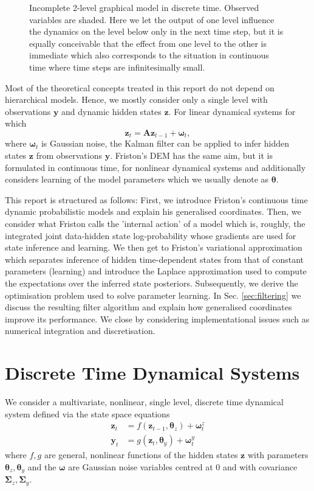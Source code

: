 \documentclass[a4paper,10pt]{article}
\newcommand{\bs}[1]{\mathbf{#1}}					%
\newcommand{\bgs}[1]{\boldsymbol{#1}}				%
\newcommand{\eq}[1]{\begin{equation} #1 \end{equation}}%
\renewcommand{\ss}{z}         %
\newcommand{\so}{y}         %
\newcommand{\sn}{\omega} %
\renewcommand{\sp}{\theta}    %
\newcommand{\ps}{\bs{\ss}}    %
\newcommand{\po}{\bs{\so}}    %
\newcommand{\pn}{\bgs{\sn}} %
\newcommand{\pp}{\bgs{\sp}} %
\newcommand{\Cov}{\bgs{\Sigma}}			%
\begin{document}
\begin{figure}
    \centering
    
    \label{fig:graphicalModel}
    \caption{Incomplete 2-level graphical model in discrete time. Observed variables are shaded. Here we let the output of one level influence the dynamics on the level below only in the next time step, but it is equally conceivable that the effect from one level to the other is immediate which also corresponds to the situation in continuous time where time steps are infinitesimally small.}
\end{figure}

Most of the theoretical concepts treated in this report do not depend on hierarchical models. Hence, we mostly consider only a single level with observations $\po$ and dynamic hidden states $\ps$. For linear dynamical systems for which
\eq{
    \ps_t = \bs{A}\ps_{t-1} + \pn_{t},
}
where $\pn_{t}$ is Gaussian noise, the Kalman filter can be applied to infer hidden states $\ps$ from observations $\po$. Friston's DEM has the same aim, but it is formulated in continuous time, for nonlinear dynamical systems and additionally considers learning of the model parameters which we usually denote as $\pp$.

This report is structured as follows: First, we introduce Friston's continuous time dynamic probabilistic models and explain his generalised coordinates. Then, we consider what Friston calls the 'internal action' of a model which is, roughly, the integrated joint data-hidden state log-probability whose gradients are used for state inference and learning. We then get to Friston's variational approximation which separates inference of hidden time-dependent states from that of constant parameters (learning) and introduce the Laplace approximation used to compute the expectations over the inferred state posteriors. Subsequently, we derive the optimisation problem used to solve parameter learning. In Sec. \ref{sec:filtering} we discuss the resulting filter algorithm and explain how generalised coordinates improve its performance. We close by considering implementational issues such as numerical integration and discretisation.


\section{Discrete Time Dynamical Systems}
We consider a multivariate, nonlinear, single level, discrete time dynamical system defined via the state space equations
\begin{align}
    \label{eq:linmodel_dyn}\ps_t &= f(\ps_{t-1}, \pp_{\ss}) + \pn_t^{\ss}\\
    \label{eq:linmodel_obs}\po_t &= g(\ps_t, \pp_{\so}) + \pn_t^{\so}
\end{align}
where $f, g$ are general, nonlinear functions of the hidden states $\ps$ with parameters $\pp_{\ss}, \pp_{\so}$ and the $\pn$ are Gaussian noise variables centred at 0 and with covariance $\Cov_{\ss}, \Cov_{\so}$.
\end{document}
